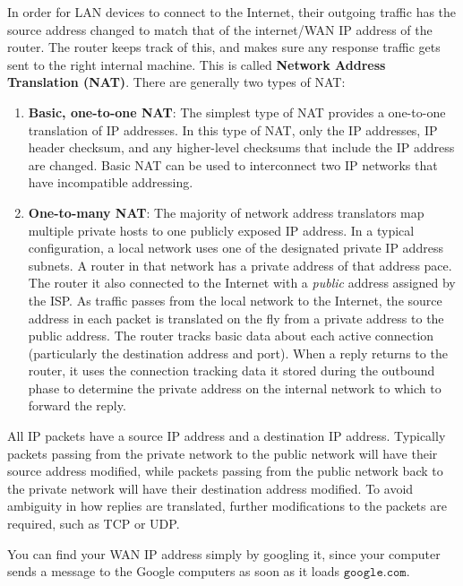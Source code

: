 \documentclass{article}
\begin{document}
  \begin{definition}[NAT]
  In order for LAN devices to connect to the Internet, their outgoing traffic has the source address changed to match that of the internet/WAN IP address of the router. The router keeps track of this, and makes sure any response traffic gets sent to the right internal machine. This is called \textbf{Network Address Translation (NAT)}. There are generally two types of NAT: 
  \begin{enumerate}
      \item \textbf{Basic, one-to-one NAT}: The simplest type of NAT provides a one-to-one translation of IP addresses. In this type of NAT, only the IP addresses, IP header checksum, and any higher-level checksums that include the IP address are changed. Basic NAT can be used to interconnect two IP networks that have incompatible addressing. 
      \item \textbf{One-to-many NAT}: The majority of network address translators map multiple private hosts to one publicly exposed IP address. In a typical configuration, a local network uses one of the designated private IP address subnets. A router in that network has a private address of that address pace. The router it also connected to the Internet with a \textit{public} address assigned by the ISP. As traffic passes from the local network to the Internet, the source address in each packet is translated on the fly from a private address to the public address. The router tracks basic data about each active connection (particularly the destination address and port). When a reply returns to the router, it uses the connection tracking data it stored during the outbound phase to determine the private address on the internal network to which to forward the reply. 
  \end{enumerate}
  All IP packets have a source IP address and a destination IP address. Typically packets passing from the private network to the public network will have their source address modified, while packets passing from the public network back to the private network will have their destination address modified. To avoid ambiguity in how replies are translated, further modifications to the packets are required, such as TCP or UDP. 
  \end{definition}

  You can find your WAN IP address simply by googling it, since your computer sends a message to the Google computers as soon as it loads $\texttt{google.com}$. 
\end{document}
